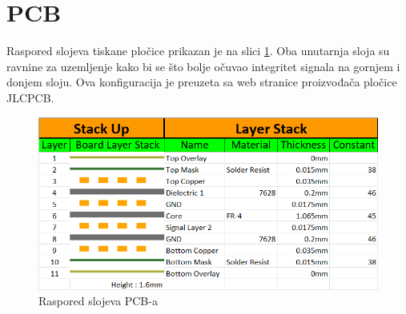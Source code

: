 \section{PCB}
Raspored slojeva tiskane pločice prikazan je na slici \ref{slk:MB_BOARD_STACKUP}. Oba unutarnja sloja su ravnine za uzemljenje kako bi se što bolje očuvao integritet signala na gornjem i donjem sloju. Ova konfiguracija je preuzeta sa web stranice proizvođača pločice JLCPCB.
\begin{figure}[htb]
    \centering
    \includegraphics[width=10 cm]{Figures/MB_BOARD_STACKUP.png}
    \caption{Raspored slojeva PCB-a}
    \label{slk:MB_BOARD_STACKUP}
\end{figure}

